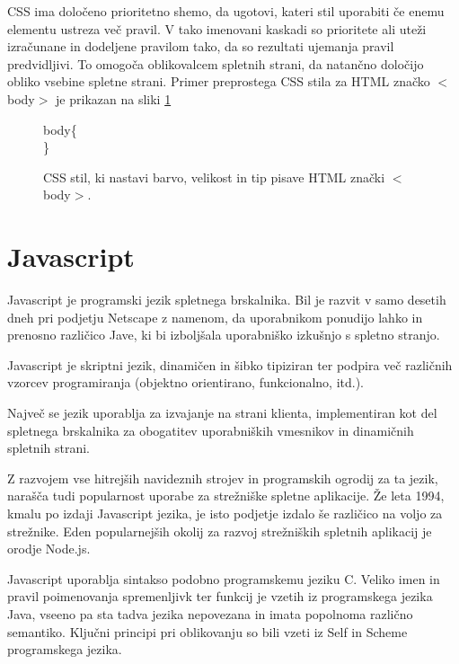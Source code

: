 \documentclass[a4paper, 12pt]{book}
\begin{document}
CSS ima dolo\v ceno prioritetno shemo, da ugotovi, kateri stil uporabiti \v ce enemu elementu ustreza ve\v c pravil. V tako imenovani kaskadi so prioritete ali ute\v zi izra\v cunane in dodeljene pravilom tako, da so rezultati ujemanja pravil predvidljivi. To omogo\v ca oblikovalcem spletnih strani, da natan\v cno dolo\v cijo obliko vsebine spletne strani. Primer preprostega CSS stila za HTML zna\v cko $<$body$>$ je prikazan na sliki \ref{fig:css stil}
\begin{figure}
body\{\\
\}
\caption{CSS stil, ki nastavi barvo, velikost in tip pisave HTML zna\v cki $<$body$>$.}
\label{fig:css stil}
\end{figure}

\section{Javascript}
Javascript je programski jezik spletnega brskalnika. Bil je razvit v samo desetih dneh pri podjetju Netscape z namenom, da uporabnikom ponudijo lahko in prenosno razli\v cico Jave, ki bi izbolj\v sala uporabni\v sko izku\v snjo s spletno stranjo. 

Javascript je skriptni jezik, dinami\v cen in \v sibko tipiziran ter podpira ve\v c razli\v cnih vzorcev programiranja (objektno orientirano, funkcionalno, itd.). 

Najve\v c se jezik uporablja za izvajanje na strani klienta, implementiran kot del spletnega brskalnika za obogatitev uporabni\v skih vmesnikov in dinami\v cnih spletnih strani. 

Z razvojem vse hitrej\v sih navideznih strojev in programskih ogrodij za ta jezik, nara\v s\v ca tudi popularnost uporabe za stre\v zni\v ske spletne aplikacije. \v Ze leta 1994, kmalu po izdaji Javascript jezika, je isto podjetje izdalo \v se razli\v cico na voljo za stre\v znike. Eden popularnej\v sih okolij za razvoj stre\v zni\v skih spletnih aplikacij je orodje Node.js.

Javascript uporablja sintakso podobno programskemu jeziku C. Veliko imen in pravil poimenovanja spremenljivk ter funkcij je vzetih iz programskega jezika Java, vseeno pa sta tadva jezika nepovezana in imata popolnoma razli\v cno semantiko. Klju\v cni principi pri oblikovanju so bili vzeti iz Self in Scheme programskega jezika. 
\end{document}
